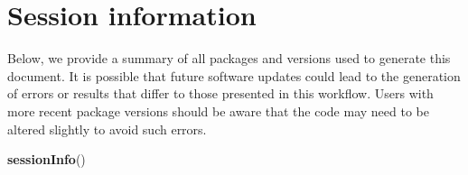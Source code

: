 \documentclass[9pt,a4paper,]{extarticle}
\newenvironment{Shaded}{\begin{snugshade}}{\end{snugshade}}
\newcommand{\FunctionTok}[1]{\textcolor[rgb]{0.13,0.29,0.53}{\textbf{#1}}}
\newcommand{\NormalTok}[1]{#1}
\begin{document}
\section{Session information}\label{session-information}

Below, we provide a summary of all packages and versions used to generate this document.
It is possible that future software updates could lead to the generation of errors
or results that differ to those presented in this workflow. Users with more recent
package versions should be aware that the code may need to be altered slightly to
avoid such errors.

\begin{Shaded}
\begin{Highlighting}[]
\FunctionTok{sessionInfo}\NormalTok{()}
\end{Highlighting}
\end{Shaded}
\end{document}
